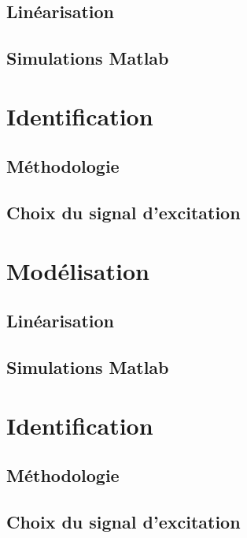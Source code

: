 \subsection{Linéarisation}
\subsection{Simulations Matlab}

\section{Identification}

\subsection{Méthodologie}

\subsection{Choix du signal d'excitation}

\section{Modélisation}

\subsection{Linéarisation}

\subsection{Simulations Matlab}

\section{Identification}

\subsection{Méthodologie}

\subsection{Choix du signal d'excitation}



